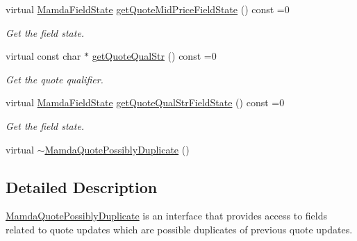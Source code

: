 \begin{CompactItemize}
virtual \hyperlink{namespaceWombat_93aac974f2ab713554fd12a1fa3b7d2a}{Mamda\-Field\-State} \hyperlink{classWombat_1_1MamdaQuotePossiblyDuplicate_f4b38e9cb0c15e3a3956d5171582fd75}{get\-Quote\-Mid\-Price\-Field\-State} () const =0
\begin{CompactList}\small\item\em Get the field state. \item\end{CompactList}\item 
virtual const char $\ast$ \hyperlink{classWombat_1_1MamdaQuotePossiblyDuplicate_34e7748f7bb365980650c6a541d2a9b9}{get\-Quote\-Qual\-Str} () const =0
\begin{CompactList}\small\item\em Get the quote qualifier. \item\end{CompactList}\item 
virtual \hyperlink{namespaceWombat_93aac974f2ab713554fd12a1fa3b7d2a}{Mamda\-Field\-State} \hyperlink{classWombat_1_1MamdaQuotePossiblyDuplicate_07b2ca2e8757b69c7a82209a99776d58}{get\-Quote\-Qual\-Str\-Field\-State} () const =0
\begin{CompactList}\small\item\em Get the field state. \item\end{CompactList}\item 
virtual \hyperlink{classWombat_1_1MamdaQuotePossiblyDuplicate_fd1bd0fd3e206e3167ffba39ccd29dea}{$\sim$Mamda\-Quote\-Possibly\-Duplicate} ()
\end{CompactItemize}


\subsection{Detailed Description}
\hyperlink{classWombat_1_1MamdaQuotePossiblyDuplicate}{Mamda\-Quote\-Possibly\-Duplicate} is an interface that provides access to fields related to quote updates which are possible duplicates of previous quote updates. 



